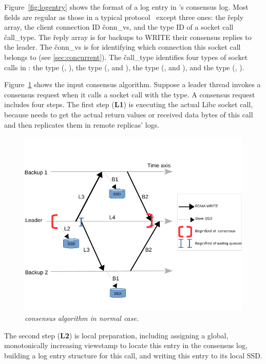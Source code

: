 Figure~\ref{fig:logentry} shows the format of a log entry in \xxx's consensus 
log. Most fields are regular as those in a typical \paxos 
protocol~\cite{paxos:practical} except three ones: the \v{reply} array, the 
client connection ID \v{conn\_vs}, and the type ID of a socket call 
\v{call\_type}. The \v{reply} array is for backups to WRITE their consensus 
replies to the leader. The \v{conn\_vs} is for identifying which connection this 
socket call belongs to (see \ref{sec:concurrent}). The \v{call\_type} 
identifies four types of socket calls in \xxx: the \accept type (\eg, \accept), 
the \recv type (\eg, \recv and \myread), the \send type (\eg, \send and 
\mywrite), and the \close type (\eg, \close).

Figure~\ref{fig:consensus} shows the input consensus algorithm. Suppose a 
leader thread invokes a consensus request when it calls a socket call with the 
\recv type. A consensus request includes four steps. The first step 
(\textbf{L1}) is executing the actual Libc socket call, because \xxx needs to 
get the actual return values or received data bytes of this call and then 
replicates them in remote replicas' logs.

\begin{figure}[b]
\centering
\vspace{-0.15in}
\includegraphics[width=.48\textwidth]{figures/consensus}
\vspace{-.4in}
\caption{{\em \xxx consensus algorithm in normal case.}} \label{fig:consensus}
\vspace{-.05in}
\end{figure}


The second step (\textbf{L2}) is local preparation, including assigning a 
global, monotonically increasing viewstamp to locate this entry in the 
consensus log, building a log entry structure for this call, and writing this 
entry to its local SSD.

